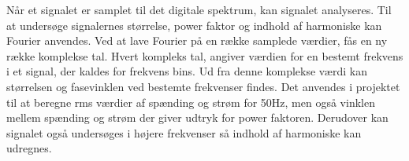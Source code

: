 Når et signalet er samplet til det digitale spektrum, kan signalet analyseres. Til at undersøge signalernes størrelse, power faktor og indhold af harmoniske kan Fourier anvendes. Ved at lave Fourier på en række samplede værdier, fås en ny række komplekse tal. Hvert kompleks tal, angiver værdien for en bestemt frekvens i et signal, der kaldes for frekvens bins. Ud fra denne komplekse værdi kan størrelsen og fasevinklen ved bestemte frekvenser findes. Det anvendes i projektet til at beregne rms værdier af spænding og strøm for 50Hz, men også vinklen mellem spænding og strøm der giver udtryk for power faktoren. Derudover kan signalet også undersøges i højere frekvenser så indhold af harmoniske kan udregnes.  

